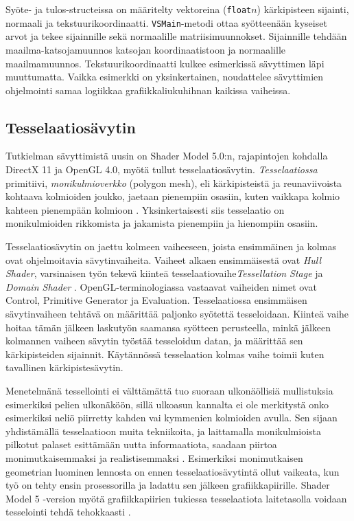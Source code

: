 \documentclass[finnish]{tktltiki2}
\theoremstyle{definition}
\theoremstyle{remark}
\begin{document}
Syöte- ja tulos-structeissa on määritelty vektoreina (\texttt{float}$n$) kärkipisteen sijainti, normaali ja tekstuurikoordinaatti. \texttt{VSMain}-metodi ottaa syötteenään kyseiset arvot  ja tekee sijainnille sekä normaalille matriisimuunnokset. Sijainnille tehdään maailma-katsojamuunnos katsojan koordinaatistoon ja normaalille maailmamuunnos. Tekstuurikoordinaatti kulkee esimerkissä sävyttimen läpi muuttumatta. Vaikka esimerkki on yksinkertainen, noudattelee sävyttimien ohjelmointi samaa logiikkaa grafiikkaliukuhihnan kaikissa vaiheissa.

\subsection{Tesselaatiosävytin}

Tutkielman sävyttimistä uusin on Shader Model 5.0:n, rajapintojen kohdalla DirectX 11 ja OpenGL 4.0, myötä tullut tesselaatiosävytin. \emph{Tesselaatiossa} primitiivi, \emph{monikulmioverkko} (polygon mesh), eli kärkipisteistä ja reunaviivoista kohtaava kolmioiden joukko\cite{Puh08}, jaetaan pienempiin osasiin, kuten vaikkapa kolmio kahteen pienempään kolmioon \cite{Nvi10}. Yksinkertaisesti siis tesselaatio on monikulmioiden rikkomista ja jakamista pienempiin ja hienompiin osasiin. 

Tesselaatiosävytin on jaettu kolmeen vaiheeseen, joista ensimmäinen ja kolmas ovat ohjelmoitavia sävytinvaiheita. Vaiheet alkaen ensimmäisestä ovat \emph{Hull Shader}, varsinaisen työn tekevä kiinteä tesselaatiovaihe\emph{Tessellation Stage} ja \emph{Domain Shader} \cite{Mic11}. OpenGL-terminologiassa vastaavat vaiheiden nimet ovat Control, Primitive Generator ja Evaluation. Tesselaatiossa ensimmäisen sävytinvaiheen tehtävä on määrittää paljonko syötettä tesseloidaan. Kiinteä vaihe hoitaa tämän jälkeen laskutyön saamansa syötteen perusteella, minkä jälkeen kolmannen vaiheen sävytin työstää tesseloidun datan, ja määrittää sen kärkipisteiden sijainnit. Käytännössä tesselaation kolmas vaihe toimii kuten tavallinen kärkipistesävytin.

Menetelmänä tessellointi ei välttämättä tuo suoraan ulkonäöllisiä mullistuksia esimerkiksi pelien ulkonäköön, sillä ulkoasun kannalta ei ole merkitystä onko esimerkiksi neliö piirretty kahden vai kymmenien kolmioiden avulla. Sen sijaan yhdistämällä tesselaatioon muita tekniikoita, ja laittamalla monikulmioista pilkotut palaset esittämään uutta informaatiota, saadaan piirtoa monimutkaisemmaksi ja realistisemmaksi \cite{Nvi10}. Esimerkiksi monimutkaisen geometrian luominen lennosta on ennen tesselaatiosävytintä ollut vaikeata, kun työ on tehty ensin prosessorilla ja ladattu sen jälkeen grafiikkapiirille. Shader Model 5 -version myötä grafiikkapiirien tukiessa tesselaatiota laitetasolla voidaan tesselointi tehdä tehokkaasti \cite{Sch14}.
\end{document}
